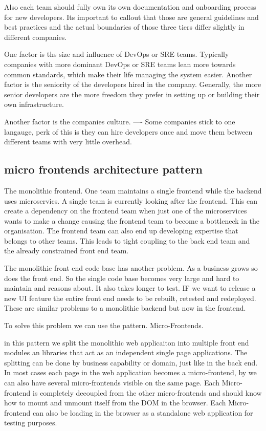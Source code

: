 \documentclass[a4paper, 11pt]{book}
\begin{document}
    Also each team should fully own its own documentation and onboarding process for new developers.
    Its important to callout that those are general guidelines and best practices and the actual boundaries of those three tiers differ slightly in different companies.

    One factor is ths size and influence of DevOps or SRE teams.
    Typically companies with more dominant DevOps or SRE teams lean more towards common standards, which make their life managing the system easier.
    Another factor is the seniority of the developers hired in the company.
    Generally, the more senior developers are the more freedom they prefer in setting up or building their own infrastructure.

    Another factor is the companies culture.
    ---- Some companies stick to one langauge, perk of this is they can hire developers once and move them between different teams with very little overhead.

    \subsection{micro frontends architecture pattern}
    The monolithic frontend. One team maintains a single frontend while the backend uses microservics. A single team is currently looking after the frontend.
    This can create a dependency on the frontend team when just one of the microservices wants to make a change causing the frontend team to become a bottleneck in the organisation.
    The frontend team can also end up developing expertise that belongs to other teams.
    This leads to tight coupling to the back end team and the already constrained front end team.

    The monolithic front end code base has another problem.
    As a business grows so does the front end.
    So the single code base becomes very large and hard to maintain and reasons about.
    It also takes longer to test.
    IF we want to release a new UI feature the entire front end needs to be rebuilt, retested and redeployed.
    These are similar problems to a monolithic backend but now in the frontend.

    To solve this problem we can use the pattern. Micro-Frontends.

    in this pattern we split the monolithic web applicaiton into multiple front end modules an libraries that act as an independent single page applications.
    The splitting can be done by business capability or domain, just like in the back end.
    In most cases each page in the web application becomes a micro-frontend, by we can also have several micro-frontends visible on the same page.
    Each Micro-frontend is completely decoupled from the other micro-frontends and should know how to mount and unmount itself from the DOM in the browser.
    Each Micro-frontend can also be loading in the browser as a standalone web application for testing purposes.
\end{document}
